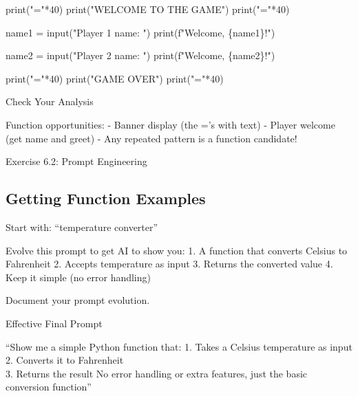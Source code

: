 \documentclass[
  letterpaper,
  DIV=11,
  numbers=noendperiod,
  oneside]{scrreprt}
\newenvironment{Shaded}{}{}
\newcommand{\BuiltInTok}[1]{\textcolor[rgb]{0.84,0.23,0.29}{#1}}
\newcommand{\DecValTok}[1]{\textcolor[rgb]{0.00,0.36,0.77}{#1}}
\newcommand{\NormalTok}[1]{\textcolor[rgb]{0.14,0.16,0.18}{#1}}
\newcommand{\OperatorTok}[1]{\textcolor[rgb]{0.14,0.16,0.18}{#1}}
\newcommand{\SpecialCharTok}[1]{\textcolor[rgb]{0.00,0.36,0.77}{#1}}
\newcommand{\SpecialStringTok}[1]{\textcolor[rgb]{0.01,0.18,0.38}{#1}}
\newcommand{\StringTok}[1]{\textcolor[rgb]{0.01,0.18,0.38}{#1}}
\begin{document}
\begin{Shaded}
\begin{Highlighting}[]
\BuiltInTok{print}\NormalTok{(}\StringTok{"="}\OperatorTok{*}\DecValTok{40}\NormalTok{)}
\BuiltInTok{print}\NormalTok{(}\StringTok{"WELCOME TO THE GAME"}\NormalTok{)}
\BuiltInTok{print}\NormalTok{(}\StringTok{"="}\OperatorTok{*}\DecValTok{40}\NormalTok{)}

\NormalTok{name1 }\OperatorTok{=} \BuiltInTok{input}\NormalTok{(}\StringTok{"Player 1 name: "}\NormalTok{)}
\BuiltInTok{print}\NormalTok{(}\SpecialStringTok{f"Welcome, }\SpecialCharTok{\{}\NormalTok{name1}\SpecialCharTok{\}}\SpecialStringTok{!"}\NormalTok{)}

\NormalTok{name2 }\OperatorTok{=} \BuiltInTok{input}\NormalTok{(}\StringTok{"Player 2 name: "}\NormalTok{)}
\BuiltInTok{print}\NormalTok{(}\SpecialStringTok{f"Welcome, }\SpecialCharTok{\{}\NormalTok{name2}\SpecialCharTok{\}}\SpecialStringTok{!"}\NormalTok{)}

\BuiltInTok{print}\NormalTok{(}\StringTok{"="}\OperatorTok{*}\DecValTok{40}\NormalTok{)}
\BuiltInTok{print}\NormalTok{(}\StringTok{"GAME OVER"}\NormalTok{)}
\BuiltInTok{print}\NormalTok{(}\StringTok{"="}\OperatorTok{*}\DecValTok{40}\NormalTok{)}
\end{Highlighting}
\end{Shaded}

Check Your Analysis

Function opportunities: - Banner display (the ='s with text) - Player
welcome (get name and greet) - Any repeated pattern is a function
candidate!

Exercise 6.2: Prompt Engineering

\subsection{Getting Function Examples}\label{getting-function-examples}

Start with: ``temperature converter''

Evolve this prompt to get AI to show you: 1. A function that converts
Celsius to Fahrenheit 2. Accepts temperature as input 3. Returns the
converted value 4. Keep it simple (no error handling)

Document your prompt evolution.

Effective Final Prompt

``Show me a simple Python function that: 1. Takes a Celsius temperature
as input 2. Converts it to Fahrenheit\\
3. Returns the result No error handling or extra features, just the
basic conversion function''
\end{document}
